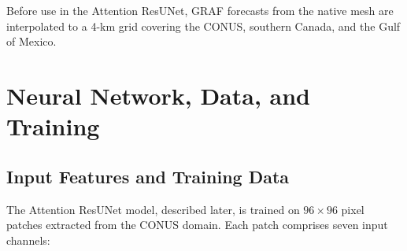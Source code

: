 \documentclass[11pt]{article}
\begin{document}
Before use in the Attention ResUNet, GRAF forecasts from the native mesh
are interpolated to a 4-km grid covering the CONUS, southern Canada, and
the Gulf of Mexico.

\section{Neural Network, Data, and Training}
\label{sec:nn}

\subsection{Input Features and Training Data}
\label{sec:features}

The Attention ResUNet model, described later, is trained 
on $96 \times 96$ pixel patches extracted from
the CONUS domain.  Each patch comprises seven input channels:
\end{document}
